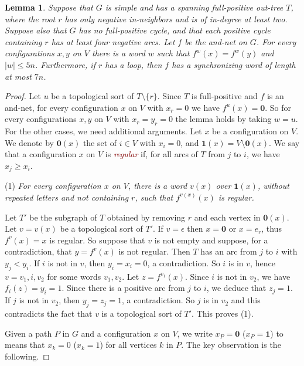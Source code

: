 \documentclass[11pt,letter]{article}
\newtheorem{lemma}{Lemma}
\newcommand{\EM}[1]{{\em\textcolor{Maroon}{#1}}}
\newcommand{\ONE}{\mathbf{1}}
\newcommand{\ZERO}{{\mathbf{0}}}
\begin{document}
\begin{lemma}\label{lem:fast-2}
Suppose that $G$ is simple and has a spanning full-positive out-tree $T$, where the root $r$ has only negative in-neighbors and is of in-degree at least two. Suppose also that $G$ has no full-positive cycle, and that each positive cycle containing $r$ has at least four negative arcs. Let $f$ be the and-net on $G$. For every configurations $x,y$ on $V$ there is a word $w$ such that $f^w(x)=f^w(y)$ and $|w|\leq 5n$. Furthermore, if $r$ has a loop, then $f$ has a synchronizing word of length at most $7n$. 
\end{lemma}

\begin{proof}
Let $u$ be a topological sort of $T\setminus\{r\}$. Since $T$ is full-positive and $f$ is an and-net, for every configuration $x$ on $V$ with $x_{r}=0$ we have $f^u(x)=\ZERO$. So for every configurations $x,y$ on $V$ with $x_{r}=y_{r}=0$ the lemma holds by taking $w=u$. For the other cases, we need additional arguments. Let $x$ be a configuration on $V$. We denote by $\ZERO(x)$ the set of $i\in V$ with $x_i=0$, and $\ONE(x)=V\setminus \ZERO(x)$. We say that a configuration $x$ on $V$ is \EM{regular} if, for all arcs of $T$ from $j$ to $i$,  we have $x_j\geq x_i$. 

\bigskip
\noindent
(1) {\em For every configuration $x$ on $V$, there is a word $v(x)$ over $\ONE(x)$, without repeated letters and not containing $r$, such that $f^{v(x)}(x)$ is regular.}

\medskip
\noindent
Let $T'$ be the subgraph of $T$ obtained by removing $r$ and each vertex in $\ZERO(x)$. Let $v=v(x)$ be a topological sort of $T'$. If $v=\epsilon$ then $x=\ZERO$ or $x=e_{r}$, thus $f^v(x)=x$ is regular. So suppose that $v$ is not empty and suppose, for a contradiction, that $y=f^v(x)$ is not regular. Then $T$ has an arc from $j$ to $i$ with $y_j<y_i$. If $i$ is not in $v$, then $y_i=x_i=0$, a contradiction. So $i$ is in $v$, hence $v=v_1,i,v_2$ for some words $v_1,v_2$. Let $z=f^{v_1}(x)$. Since $i$ is not in $v_2$, we have $f_i(z)=y_i=1$. Since there is a positive arc from $j$ to $i$, we deduce that $z_j=1$. If $j$ is not in $v_2$, then $y_j=z_j=1$, a contradiction. So $j$ is in $v_2$ and this contradicts the fact that $v$ is a topological sort of $T'$. This proves (1).

\bigskip
Given a path $P$ in $G$ and a configuration $x$ on $V$, we write $x_P=\ZERO$ ($x_P=\ONE$) to means that $x_k=0$ ($x_k=1$) for all vertices $k$ in $P$. The key observation is the following. 


\end{proof}
\end{document}
